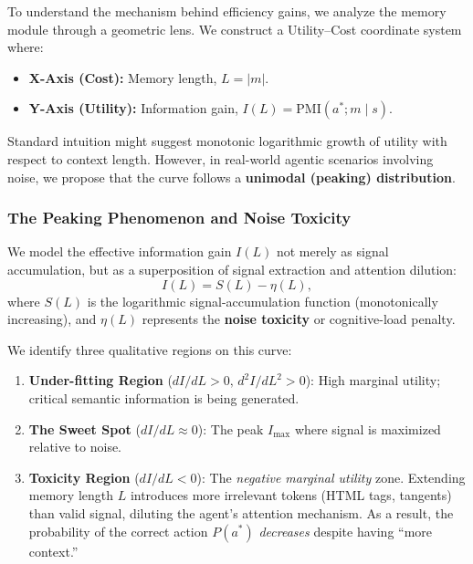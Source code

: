 To understand the mechanism behind efficiency gains, we analyze the memory module through a geometric lens.  
We construct a Utility--Cost coordinate system where:

\begin{itemize}
    \item \textbf{X-Axis (Cost):} Memory length, $L = |m|$.
    \item \textbf{Y-Axis (Utility):} Information gain, $I(L) = \mathrm{PMI}(a^*; m \mid s)$.
\end{itemize}

Standard intuition might suggest monotonic logarithmic growth of utility with respect to context length.  
However, in real-world agentic scenarios involving noise, we propose that the curve follows a \textbf{unimodal (peaking) distribution}.

\subsubsection{The Peaking Phenomenon and Noise Toxicity}

We model the effective information gain $I(L)$ not merely as signal accumulation, but as a superposition of signal extraction and attention dilution:
\[
I(L) = S(L) - \eta(L),
\]
where $S(L)$ is the logarithmic signal-accumulation function (monotonically increasing), and $\eta(L)$ represents the \textbf{noise toxicity} or cognitive-load penalty.

We identify three qualitative regions on this curve:

\begin{enumerate}
    \item \textbf{Under-fitting Region} ($dI/dL > 0,\, d^2 I / dL^2 > 0$):  
    High marginal utility; critical semantic information is being generated.

    \item \textbf{The Sweet Spot} ($dI/dL \approx 0$):  
    The peak $I_{\max}$ where signal is maximized relative to noise.

    \item \textbf{Toxicity Region} ($dI/dL < 0$):  
    The \emph{negative marginal utility} zone.  
    Extending memory length $L$ introduces more irrelevant tokens (HTML tags, tangents) than valid signal, diluting the agent's attention mechanism.  
    As a result, the probability of the correct action $P(a^*)$ \emph{decreases} despite having ``more context.''
\end{enumerate}

